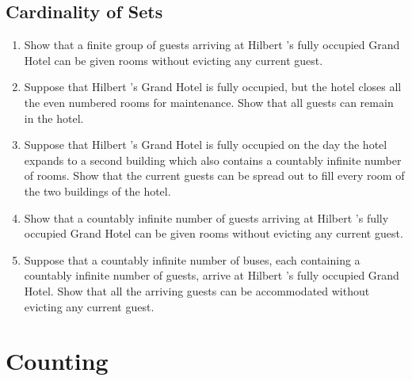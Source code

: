 \documentclass{../../cls/sig-alternate-05-2015}
\begin{document}
\subsection{Cardinality of Sets}
\begin{enumerate}
\item Show that a finite group of guests arriving at Hilbert \textquoteright s
fully occupied Grand Hotel can be given rooms without
evicting any current guest.
\item Suppose that Hilbert \textquoteright s Grand Hotel is fully occupied, but
the hotel closes all the even numbered rooms for maintenance.
Show that all guests can remain in the hotel.
\item Suppose that Hilbert \textquoteright s Grand Hotel is fully occupied on
the day the hotel expands to a second building which also
contains a countably infinite number of rooms. Show that
the current guests can be spread out to fill every room of
the two buildings of the hotel.
\item Show that a countably infinite number of guests arriving
at Hilbert \textquoteright s fully occupied Grand Hotel can be given
rooms without evicting any current guest.
\item Suppose that a countably infinite number of buses, each
containing a countably infinite number of guests, arrive
at Hilbert \textquoteright s fully occupied Grand Hotel. Show that all the
arriving guests can be accommodated without evicting
any current guest.
\end{enumerate}

\section{Counting}
\end{document}
